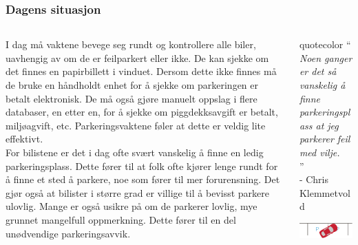 \documentclass[xetex]{beamer}
\begin{document}
\begin{frame}\label{fr:dagens_situasjon}
	\frametitle{Dagens situasjon}
	
		\begin{columns}[onlytextwidth]
		\begin{column}{0.60\textwidth}
			I dag må vaktene bevege seg rundt og \alert{kontrollere alle biler}, uavhengig av  om de er feilparkert eller ikke. De kan sjekke om det finnes en papirbillett i vinduet. Dersom dette ikke finnes må de bruke en håndholdt enhet for å sjekke om parkeringen er betalt elektronisk. De må også gjøre \alert{manuelt oppslag i flere databaser}, en etter en, for å sjekke om piggdekksavgift er betalt, miljøagvift, etc. Parkeringsvaktene føler at dette er veldig \alert{lite effektivt}. \\ [1em]
	
	For bilistene er det i dag ofte svært \alert{vanskelig å finne en ledig parkeringsplass}. Dette fører til at folk ofte kjører lenge rundt for å finne et sted å parkere, noe som fører til mer \alert{forurensning}. Det gjør også at bilister i større grad er villige til å bevisst parkere ulovlig. Mange er også usikre på om de parkerer lovlig, mye grunnet mangelfull oppmerkning. Dette fører til en del \alert{unødvendige parkeringsavvik}.
		\end{column}
		\begin{column}{0.35\textwidth}
	\hspace{16em}\begin{beamercolorbox}[wd=0.33\paperwidth,ht=17ex,dp=3pt,leftskip=.3cm,rightskip=.3cm]{quotecolor}
	\huge`` \\[-0.5em]
    \tiny
    \hspace{1.5em}\vspace{0.0em}\emph{Noen ganger er det så vanskelig å finne parkeringsplass at jeg parkerer feil med vilje.} \\ [-1.8em]
    
    \hspace{0.27\paperwidth}\huge'' \\ [-0.3em]
    
    \hfill\tiny- Chris Klemmetvold \\ [1em] %
\end{beamercolorbox}
	
			\vspace{2em}\includegraphics[angle=30]{grafikk/feilparkering.pdf}
		\end{column}
	\end{columns}
	
\end{frame}
\end{document}
